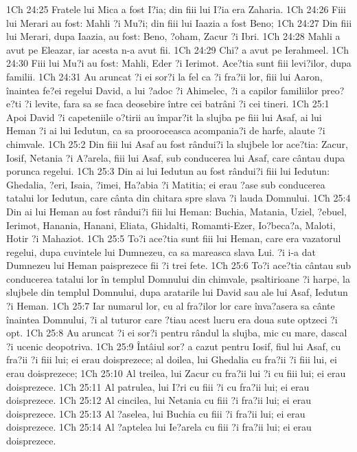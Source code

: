 1Ch 24:25  Fratele lui Mica a fost I?ia; din fiii lui I?ia era Zaharia.
1Ch 24:26  Fiii lui Merari au fost: Mahli ?i Mu?i; din fiii lui Iaazia a fost Beno;
1Ch 24:27  Din fiii lui Merari, dupa Iaazia, au fost: Beno, ?oham, Zacur ?i Ibri.
1Ch 24:28  Mahli a avut pe Eleazar, iar acesta n-a avut fii.
1Ch 24:29  Chi? a avut pe Ierahmeel.
1Ch 24:30  Fiii lui Mu?i au fost: Mahli, Eder ?i Ierimot. Ace?tia sunt fiii levi?ilor, dupa familii.
1Ch 24:31  Au aruncat ?i ei sor?i la fel ca ?i fra?ii lor, fiii lui Aaron, înaintea fe?ei regelui David, a lui ?adoc ?i Ahimelec, ?i a capilor familiilor preo?e?ti ?i levite, fara sa se faca deosebire între cei batrâni ?i cei tineri.
1Ch 25:1  Apoi David ?i capeteniile o?tirii au împar?it la slujba pe fiii lui Asaf, ai lui Heman ?i ai lui Iedutun, ca sa prooroceasca acompania?i de harfe, alaute ?i chimvale.
1Ch 25:2  Din fiii lui Asaf au fost rândui?i la slujbele lor ace?tia: Zacur, Iosif, Netania ?i A?arela, fiii lui Asaf, sub conducerea lui Asaf, care cântau dupa porunca regelui.
1Ch 25:3  Din ai lui Iedutun au fost rândui?i fiii lui Iedutun: Ghedalia, ?eri, Isaia, ?imei, Ha?abia ?i Matitia; ei erau ?ase sub conducerea tatalui lor Iedutun, care cânta din chitara spre slava ?i lauda Domnului.
1Ch 25:4  Din ai lui Heman au fost rândui?i fiii lui Heman: Buchia, Matania, Uziel, ?ebuel, Ierimot, Hanania, Hanani, Eliata, Ghidalti, Romamti-Ezer, Io?beca?a, Maloti, Hotir ?i Mahaziot.
1Ch 25:5  To?i ace?tia sunt fiii lui Heman, care era vazatorul regelui, dupa cuvintele lui Dumnezeu, ca sa mareasca slava Lui. ?i i-a dat Dumnezeu lui Heman paisprezece fii ?i trei fete.
1Ch 25:6  To?i ace?tia cântau sub conducerea tatalui lor în templul Domnului din chimvale, psaltirioane ?i harpe, la slujbele din templul Domnului, dupa aratarile lui David sau ale lui Asaf, Iedutun ?i Heman.
1Ch 25:7  Iar numarul lor, cu al fra?ilor lor care înva?asera sa cânte înaintea Domnului, ?i al tuturor care ?tiau acest lucru era doua sute optzeci ?i opt.
1Ch 25:8  Au aruncat ?i ei sor?i pentru rândul la slujba, mic cu mare, dascal ?i ucenic deopotriva.
1Ch 25:9  Întâiul sor? a cazut pentru Iosif, fiul lui Asaf, cu fra?ii ?i fiii lui; ei erau doisprezece; al doilea, lui Ghedalia cu fra?ii ?i fiii lui, ei erau doisprezece;
1Ch 25:10  Al treilea, lui Zacur cu fra?ii lui ?i cu fiii lui; ei erau doisprezece.
1Ch 25:11  Al patrulea, lui I?ri cu fiii ?i cu fra?ii lui; ei erau doisprezece.
1Ch 25:12  Al cincilea, lui Netania cu fiii ?i fra?ii lui; ei erau doisprezece.
1Ch 25:13  Al ?aselea, lui Buchia cu fiii ?i fra?ii lui; ei erau doisprezece.
1Ch 25:14  Al ?aptelea lui Ie?arela cu fiii ?i fra?ii lui; ei erau doisprezece.

